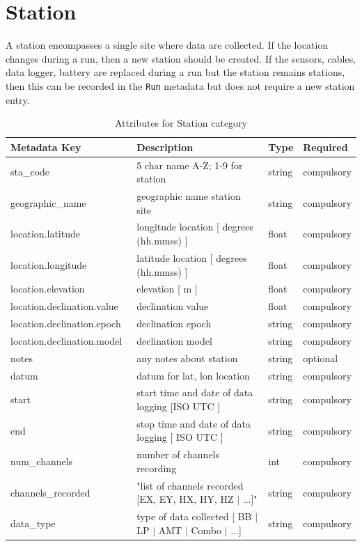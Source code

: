 \documentclass{article}
\begin{document}
\newpage
\section{Station}

A station encompasses a single site where data are collected. If the location changes during a run, then a new station should be created. If the sensors, cables, data logger, battery are replaced during a run but the station remains stations, then this can be recorded in the \verb|Run| metadata but does not require a new station entry.

\begin{table}[htb!]
    \caption[Attributes for Station]{Attributes for Station category}
    \begin{tabular}{|l|p{3in}|l|l|}
        \hline
        \textbf{Metadata Key} & \textbf{Description} & \textbf{Type} & \textbf{Required} \\ \hline
        sta\_code\ & 5 char name {A-Z; 1-9} for station & string & compulsory \\ \hline
        geographic\_name\ & geographic name station site & string & compulsory \\ \hline
        location.latitude\ & longitude location [ degrees (hh.mmss) ] & float & compulsory \\ \hline
        location.longitude\ & latitude location [ degrees (hh.mmss) ] & float & compulsory \\ \hline
        location.elevation\ & elevation [ m ] & float & compulsory \\ \hline
        location.declination.value\ & declination value & float & compulsory \\ \hline
        location.declination.epoch\ & declination epoch & string & compulsory \\ \hline
        location.declination.model\ & declination model & string & compulsory \\ \hline
        notes\ & any notes about station & string & optional \\ \hline
        datum\ & datum for lat, lon location & string & compulsory \\ \hline
        start\ & start time and date of data logging [ISO UTC ] & string & compulsory \\ \hline
        end\ & stop time and date of data logging  [ ISO UTC ] & string & compulsory \\ \hline
        num\_channels\ & number of channels recording & int & compulsory \\ \hline
        channels\_recorded\ & "list of channels recorded [EX, EY, HX, HY, HZ $|$ ...]" & string & compulsory \\ \hline
        data\_type\ & type of data collected [ BB $|$ LP $|$ AMT $|$ Combo $|$ ...] & string & compulsory \\ \hline


\end{tabular}
\end{table}
\end{document}
